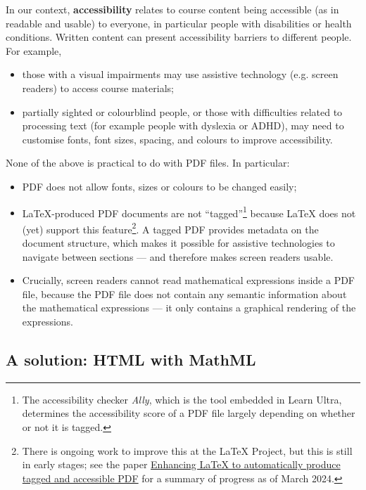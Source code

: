 In our context, \textbf{accessibility} relates to course content being accessible (as in readable and usable) to everyone, in particular people with disabilities or health conditions. Written content can present accessibility barriers to different people. For example,
\begin{itemize}
    \item those with a visual impairments may use assistive technology (e.g. screen readers) to access course materials;
    \item partially sighted or colourblind people, or those with difficulties related to processing text (for example people with dyslexia or ADHD), may need to customise fonts, font sizes, spacing, and colours to improve accessibility.
\end{itemize}

None of the above is practical to do with PDF files. In particular:
\begin{itemize}
    \item PDF does not allow fonts, sizes or colours to be changed easily;
    \item \LaTeX{}-produced PDF documents are not ``tagged''\footnote{The accessibility checker \textit{Ally}, which is the tool embedded in Learn Ultra, determines the accessibility score of a PDF file largely depending on whether or not it is tagged.} because \LaTeX{} does not (yet) support this feature\footnote{There is ongoing work to improve this at the \LaTeX{} Project, but this is still in early stages; see the paper \href{https://www.latex-project.org/publications/2024-FMi-UFi-TUB-tb139mitt-deims24.pdf}{Enhancing \LaTeX{} to automatically produce
tagged and accessible PDF} for a summary of progress as of March 2024.}. A tagged PDF provides metadata on the document structure, which makes it possible for assistive technologies to navigate between sections --- and therefore makes screen readers usable.
    \item Crucially, screen readers cannot read mathematical expressions inside a PDF file, because the PDF file does not contain any semantic information about the mathematical expressions --- it only contains a graphical rendering of the expressions.
\end{itemize}


\subsection{A solution: HTML with MathML}
\label{sec:context:HTML}

